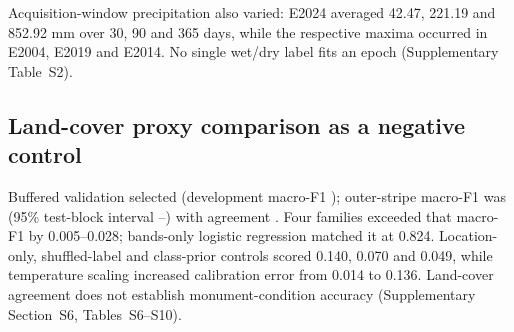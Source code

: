 Acquisition-window precipitation also varied: E2024 averaged 42.47, 221.19 and 852.92 mm over 30, 90 and 365 days, while the respective maxima occurred in E2004, E2019 and E2014. No single wet/dry label fits an epoch (Supplementary Table~S2).

\subsection{Land-cover proxy comparison as a negative control}
Buffered validation selected \ExtensionModel{} (development macro-F1 \ExtensionCV{}); outer-stripe macro-F1 was \ExtensionFOne{} (95\% test-block interval \ExtensionLow{}--\ExtensionHigh{}) with agreement \ExtensionAgreement{}. Four families exceeded that macro-F1 by 0.005--0.028; bands-only logistic regression matched it at 0.824. Location-only, shuffled-label and class-prior controls scored 0.140, 0.070 and 0.049, while temperature scaling increased calibration error from 0.014 to 0.136. Land-cover agreement does not establish monument-condition accuracy (Supplementary Section~S6, Tables~S6--S10).
